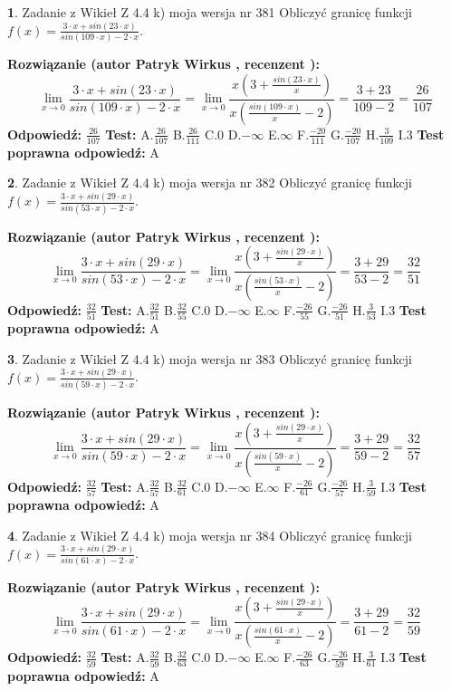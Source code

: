 \documentclass[12pt, a4paper]{article}
\theoremstyle{definition} %
\newtheorem{zad}{}
\newcommand{\zadStart}[1]{\begin{zad}#1\newline}
\newcommand{\zadStop}{\end{zad}}
\newcommand{\rozwStart}[2]{\noindent \textbf{Rozwiązanie (autor #1 , recenzent #2): }\newline}
\newcommand{\rozwStop}{\newline}
\newcommand{\odpStart}{\noindent \textbf{Odpowiedź:}\newline}
\newcommand{\odpStop}{\newline}
\newcommand{\testStart}{\noindent \textbf{Test:}\newline}
\newcommand{\testStop}{\newline}
\newcommand{\kluczStart}{\noindent \textbf{Test poprawna odpowiedź:}\newline}
\newcommand{\kluczStop}{\newline}
\begin{document}
\zadStart{Zadanie z Wikieł Z 4.4 k) moja wersja nr 381}
Obliczyć granicę funkcji $f(x)=\frac{3\cdot x +sin(23\cdot x)}{sin(109\cdot x) -2\cdot x}$.
\zadStop
\rozwStart{Patryk Wirkus}{}
$$\lim\limits_{x\to 0}\frac{3\cdot x +sin(23\cdot x)}{sin(109\cdot x) -2\cdot x}
=\lim\limits_{x\to 0}\frac{x(3+\frac{sin(23\cdot x)}{x})}{x(\frac{sin(109\cdot x)}{x}-2)}
=\frac{3+23}{109-2} = \frac{26}{107}$$
\rozwStop
\odpStart
$\frac{26}{107}$
\odpStop
\testStart
A.$\frac{26}{107}$
B.$\frac{26}{111}$
C.$0$
D.$-\infty$
E.$\infty$
F.$\frac{-20}{111}$
G.$\frac{-20}{107}$
H.$\frac{3}{109}$
I.$3$
\testStop
\kluczStart
A
\kluczStop



\zadStart{Zadanie z Wikieł Z 4.4 k) moja wersja nr 382}
Obliczyć granicę funkcji $f(x)=\frac{3\cdot x +sin(29\cdot x)}{sin(53\cdot x) -2\cdot x}$.
\zadStop
\rozwStart{Patryk Wirkus}{}
$$\lim\limits_{x\to 0}\frac{3\cdot x +sin(29\cdot x)}{sin(53\cdot x) -2\cdot x}
=\lim\limits_{x\to 0}\frac{x(3+\frac{sin(29\cdot x)}{x})}{x(\frac{sin(53\cdot x)}{x}-2)}
=\frac{3+29}{53-2} = \frac{32}{51}$$
\rozwStop
\odpStart
$\frac{32}{51}$
\odpStop
\testStart
A.$\frac{32}{51}$
B.$\frac{32}{55}$
C.$0$
D.$-\infty$
E.$\infty$
F.$\frac{-26}{55}$
G.$\frac{-26}{51}$
H.$\frac{3}{53}$
I.$3$
\testStop
\kluczStart
A
\kluczStop



\zadStart{Zadanie z Wikieł Z 4.4 k) moja wersja nr 383}
Obliczyć granicę funkcji $f(x)=\frac{3\cdot x +sin(29\cdot x)}{sin(59\cdot x) -2\cdot x}$.
\zadStop
\rozwStart{Patryk Wirkus}{}
$$\lim\limits_{x\to 0}\frac{3\cdot x +sin(29\cdot x)}{sin(59\cdot x) -2\cdot x}
=\lim\limits_{x\to 0}\frac{x(3+\frac{sin(29\cdot x)}{x})}{x(\frac{sin(59\cdot x)}{x}-2)}
=\frac{3+29}{59-2} = \frac{32}{57}$$
\rozwStop
\odpStart
$\frac{32}{57}$
\odpStop
\testStart
A.$\frac{32}{57}$
B.$\frac{32}{61}$
C.$0$
D.$-\infty$
E.$\infty$
F.$\frac{-26}{61}$
G.$\frac{-26}{57}$
H.$\frac{3}{59}$
I.$3$
\testStop
\kluczStart
A
\kluczStop



\zadStart{Zadanie z Wikieł Z 4.4 k) moja wersja nr 384}
Obliczyć granicę funkcji $f(x)=\frac{3\cdot x +sin(29\cdot x)}{sin(61\cdot x) -2\cdot x}$.
\zadStop
\rozwStart{Patryk Wirkus}{}
$$\lim\limits_{x\to 0}\frac{3\cdot x +sin(29\cdot x)}{sin(61\cdot x) -2\cdot x}
=\lim\limits_{x\to 0}\frac{x(3+\frac{sin(29\cdot x)}{x})}{x(\frac{sin(61\cdot x)}{x}-2)}
=\frac{3+29}{61-2} = \frac{32}{59}$$
\rozwStop
\odpStart
$\frac{32}{59}$
\odpStop
\testStart
A.$\frac{32}{59}$
B.$\frac{32}{63}$
C.$0$
D.$-\infty$
E.$\infty$
F.$\frac{-26}{63}$
G.$\frac{-26}{59}$
H.$\frac{3}{61}$
I.$3$
\testStop
\kluczStart
A
\kluczStop
\end{document}
